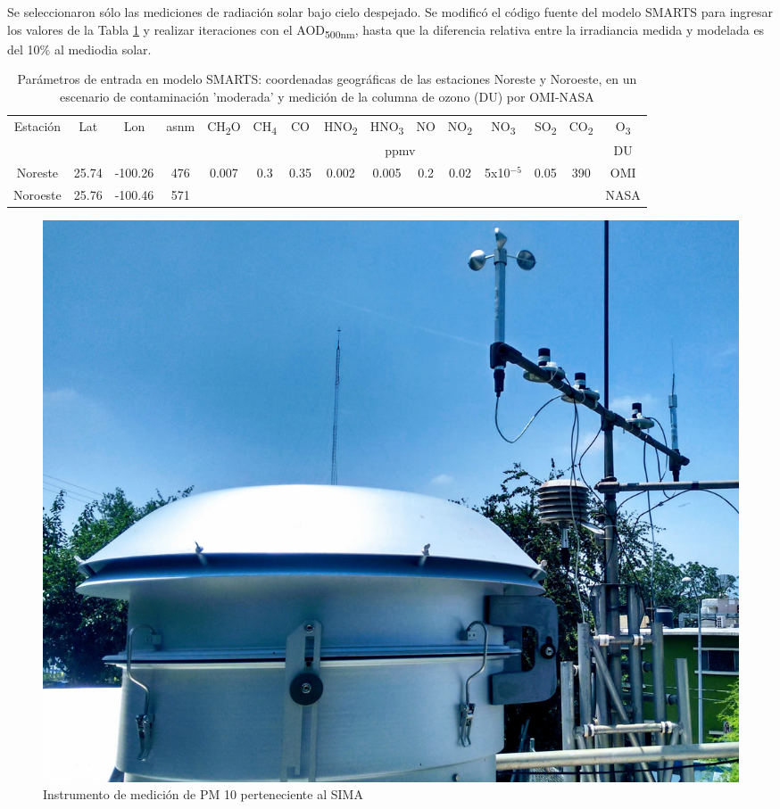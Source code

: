 \documentclass{article}
\begin{document}
\begin{minipage}{0.75\linewidth}
Se seleccionaron sólo las mediciones de radiación solar bajo cielo despejado. Se modificó el código fuente del modelo 
SMARTS para ingresar los valores de la Tabla \ref{tabla:parametros} y realizar iteraciones con el AOD\textsubscript{500nm}, 
hasta que la diferencia relativa entre la irradiancia medida y modelada es del 10\% al mediodia solar.
\begin{table}[H]
    \changefontsizes{9.5pt}
        \centering
    \begin{tabular}{|c|c|c|c|c|c|c|c|c|c|c|c|c|c|c|} \hline
         \multirow{2}{*}{Estación} & \multirow{2}{*}{Lat}& \multirow{2}{*}{Lon} & \multirow{2}{*}{asnm} & CH\textsubscript{2}O & CH\textsubscript{4}& CO & HNO\textsubscript{2} & HNO\textsubscript{3} & NO & NO\textsubscript{2} & NO\textsubscript{3} & SO\textsubscript{2} & CO\textsubscript{2}&O\textsubscript{3}\\ \cline{5-15}
                &       &   &  & \multicolumn{10}{c|}{ppmv}  & \multicolumn{1}{c|}{DU} \\ \hline
       Noreste &  25.74&-100.26&476   & \multirow{2}{*}{0.007} & \multirow{2}{*}{0.3}& \multirow{2}{*}{0.35}    &   \multirow{2}{*}{0.002}  &  \multirow{2}{*}{0.005} & \multirow{2}{*}{0.2} & \multirow{2}{*}{0.02} & \multirow{2}{*}{5x10$^{-5}$}  &\multirow{2}{*}{0.05} & \multirow{2}{*}{390}&OMI\\
        Noroeste &  25.76&-100.46&571  &  & & & &  &  &  & &  & & NASA\\\hline
    \end{tabular}
    \caption{ Parámetros de entrada en modelo SMARTS: coordenadas geográficas de las estaciones Noreste y Noroeste, en un escenario de contaminación 'moderada' y medición de la columna de ozono (DU) por OMI-NASA}
    \label{tabla:parametros}
\end{table}
\end{minipage}
\begin{minipage}{0.25\linewidth}
    \begin{figure}[H]
    \includegraphics[scale=0.08]{images/mediciones.jpg}
    \caption{ Instrumento de medición de PM 10 perteneciente al SIMA}
    \end{figure}
\end{minipage}
\end{document}
